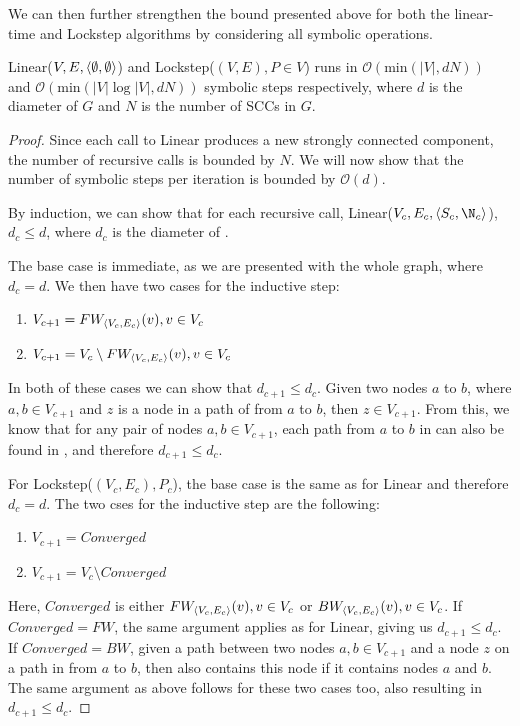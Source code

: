 \documentclass[../master/master.tex]{subfiles}
\begin{document}
We can then further strengthen the bound presented above for both the linear-time and Lockstep algorithms by considering all symbolic operations.
\begin{theorem}\label{linear-strengthened} Linear($V, E, \pair{\emptyset}{\emptyset}$) and Lockstep($(V, E), P\in V$) runs in $\mathcal{O}(\text{min}(|V|, dN))$ and $\mathcal{O}(\text{min}(|V|\log|V|, dN))$ symbolic steps respectively, where $d$ is the diameter of $G$ and $N$ is the number of SCCs in $G$.\end{theorem}
\begin{proof}
  Since each call to Linear produces a new strongly connected component, the number of recursive calls is bounded by $N$. We will now show that the number of symbolic steps per iteration is bounded by $\mathcal{O}(d)$.

  By induction, we can show that for each recursive call, Linear($V_c, E_c, \pair{S_c}{\N_c}$), $d_c\leq d$, where $d_c$ is the diameter of .
  
  The base case is immediate, as we are presented with the whole graph, where $d_c=d$. We then have two cases for the inductive step:
  \begin{enumerate}
  \item $V_{c+1} = \FW[\pair{V_c}{E_c}]{v}, v\in V_c$
  \item  $V_{c+1} = V_c\setminus\FW[\pair{V_c}{E_c}]{v}, v\in V_c$
  \end{enumerate}

  In both of these cases we can show that $d_{c+1}\leq d_c$. Given two nodes $a$ to $b$, where $a, b \in V_{c+1}$ and $z$ is a node in a path of  from $a$ to $b$, then $z\in V_{c+1}$. From this, we know that for any pair of nodes $a, b\in V_{c+1}$, each path from $a$ to $b$ in  can also be found in , and therefore $d_{c+1}\leq d_c$.
  
  For Lockstep($(V_c, E_c), P_c$), the base case is the same as for Linear and therefore $d_c=d$. The two cses for the inductive step are the following:
  \begin{enumerate}
  \item $V_{c+1} = Converged$
  \item  $V_{c+1} = V_c\setminus Converged$
  \end{enumerate}
  
  Here, $Converged$ is either $\FW[\pair{V_c}{E_c}]{v}, v\in V_c$ or $\BW[\pair{V_c}{E_c}]{v}, v\in V_c$. If $Converged = FW$, the same argument applies as for Linear, giving us $d_{c+1}\leq d_c$. If $Converged=BW$, given a path between two nodes $a, b \in V_{c+1}$ and a node $z$ on a path in  from $a$ to $b$, then  also contains this node if it contains nodes $a$ and $b$. The same argument as above follows for these two cases too, also resulting in $d_{c+1}\leq d_c$. 
  

\end{proof}
\end{document}
